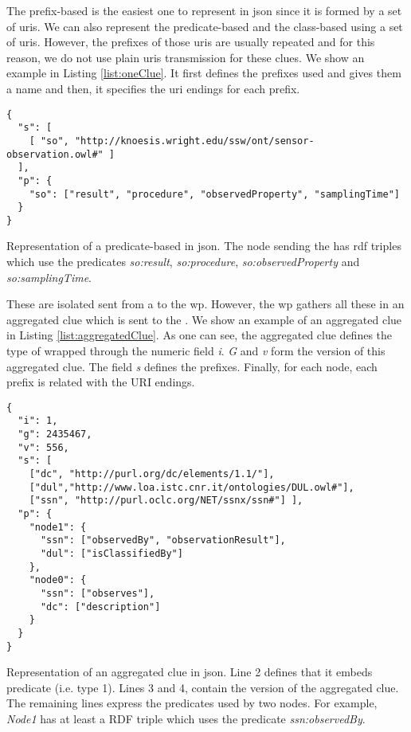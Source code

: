 The prefix-based \clue{} is the easiest one to represent in \ac{json} since it is formed by a set of \acp{uri}.
We can also represent the predicate-based and the class-based \clues{} using a set of \acp{uri}.
However, the prefixes of those \acp{uri} are usually repeated and for this reason, we do not use plain \acp{uri} transmission for these clues.
We show an example in Listing \ref{list:oneClue}.
It first defines the prefixes used and gives them a name and then, it specifies the \ac{uri} endings for each prefix.

\begin{listing}
  \begin{verbatim}
{
  "s": [
    [ "so", "http://knoesis.wright.edu/ssw/ont/sensor-observation.owl#" ]
  ],
  "p": {
    "so": ["result", "procedure", "observedProperty", "samplingTime"]
  }
}
  \end{verbatim}
  \caption{
    Representation of a predicate-based \clue{} in \acs{json}.
    The node sending the \clue{} has \acs{rdf} triples which use the predicates
    \emph{so:result}, \emph{so:procedure}, \emph{so:observedProperty} and \emph{so:samplingTime}.
  }
  \label{list:oneClue}
\end{listing}

\medskip

These are isolated \clues{} sent from a \provider{} to the \ac{wp}.
However, the \ac{wp} gathers all these \clues{} in an aggregated clue which is sent to the \consumer{}.
We show an example of an aggregated clue in Listing \ref{list:aggregatedClue}.
As one can see, the aggregated clue defines the type of \clues{} wrapped through the numeric field \emph{i}.
\emph{G} and \emph{v} form the version of this aggregated clue.
The field \emph{s} defines the prefixes.
Finally, for each node, each prefix is related with the URI endings.

\begin{listing}
  \begin{verbatim}
{
  "i": 1,
  "g": 2435467,
  "v": 556,
  "s": [
    ["dc", "http://purl.org/dc/elements/1.1/"],
    ["dul","http://www.loa.istc.cnr.it/ontologies/DUL.owl#"],
    ["ssn", "http://purl.oclc.org/NET/ssnx/ssn#"] ],
  "p": {
    "node1": {
      "ssn": ["observedBy", "observationResult"],
      "dul": ["isClassifiedBy"]
    },
    "node0": {
      "ssn": ["observes"],
      "dc": ["description"]
    }
  }
}
  \end{verbatim}
  \caption{
    Representation of an aggregated clue in \ac{json}.
    Line 2 defines that it embeds predicate \clues{} (i.e. type 1).
    Lines 3 and 4, contain the version of the aggregated clue.
    The remaining lines express the predicates used by two nodes.
    For example, \emph{Node1} has at least a RDF triple which uses the predicate \emph{ssn:observedBy}.
  }
  \label{list:aggregatedClue}
\end{listing}

